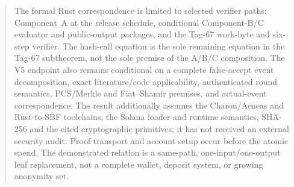 \documentclass[11pt]{article}
\theoremstyle{definition}
\theoremstyle{remark}
\begin{document}
\begin{abstract}
The formal Rust correspondence is limited to selected verifier paths:
Component~A at the release schedule, conditional Component-B/C evaluator and
public-output packages, and the Tag-67 work-byte and six-step verifier.  The
hash-call equation is the sole remaining equation in the Tag-67 subtheorem,
not the sole premise of the A/B/C composition.  The V5 endpoint also remains
conditional on a complete false-accept event decomposition, exact
literature/code applicability, authenticated round semantics, PCS/Merkle and
Fiat--Shamir premises, and actual-event correspondence.  The result additionally
assumes the Charon/Aeneas and Rust-to-SBF toolchains, the Solana loader and
runtime semantics, SHA-256 and the cited cryptographic primitives; it has not
received an external security audit.  Proof transport and account setup occur
before the atomic spend.  The demonstrated relation is a same-path,
one-input/one-output leaf replacement, not a complete wallet, deposit system,
or growing anonymity set.
\end{abstract}

















\appendix




\end{document}
